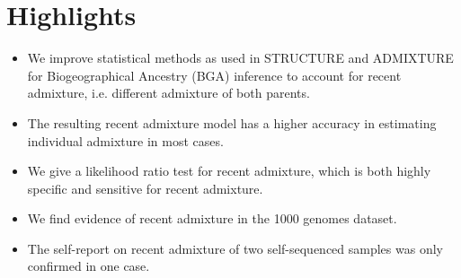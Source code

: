 \documentclass[12pt]{article}
\theoremstyle{definition}
\begin{document}
\section*{Highlights}
\begin{itemize}
    \item We improve statistical methods as used in {\sc STRUCTURE} and {\sc ADMIXTURE} for Biogeographical Ancestry (BGA) inference to account for recent admixture, i.e. different admixture of both parents.
    \item The resulting recent admixture model has a higher accuracy in estimating individual admixture in most cases. 
    \item We give a likelihood ratio test for recent admixture, which is both highly specific and sensitive for recent admixture.
    \item We find evidence of recent admixture in the 1000 genomes dataset.
    \item The self-report on recent admixture of two self-sequenced samples was {\color{blue} only confirmed in one case.}
    \end{itemize}
\end{document}
